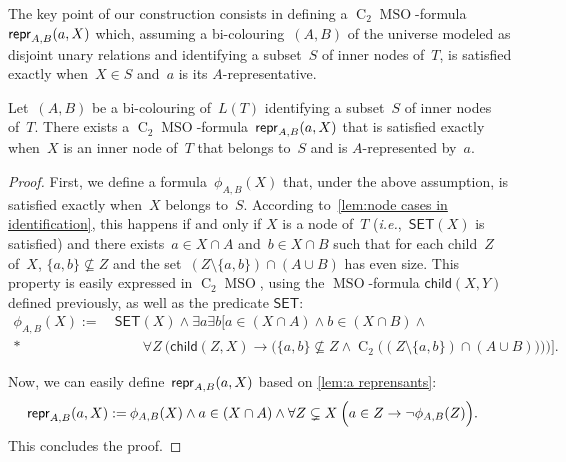 \documentclass{lmcs} %
\newcommand{\MSO}{\ensuremath{\operatorname{MSO}}\xspace}
\newcommand{\CMSO}[1][]{\ensuremath{\C[#1]{\!\!}\MSO}\xspace}
\newcommand{\C}[1][]{\ensuremath{\operatorname{C}_{#1}}\xspace}
\newcommand{\SET}{\ensuremath{\mathsf{SET}}\xspace}
\newcommand{\child}{\ensuremath{\mathsf{child}}\xspace}
\newcommand{\ifof}{if and only if\xspace}
\renewcommand{\implies}{\rightarrow}
\def\ie{{\em i.e.}}
\begin{document}
The key point of our construction consists in defining
a \CMSO[2]-formula
$\repr_{A,B}(a, X)$ which,
assuming a bi-colouring~$(A, B)$ of the universe
modeled as disjoint unary relations
and
identifying a subset~$S$ of inner nodes of~$T$,
is satisfied exactly when~$X\in S$ and~$a$ is its $A$-representative.
\begin{lem}
    \label{lem:repr MSO}
    Let~$(A,B)$ be a bi-colouring of~$L(T)$
    identifying a subset~$S$ of inner nodes of~$T$.
    There exists a \CMSO[2]-formula~$\repr_{A,B}(a, X)$
    that is satisfied exactly
    when~$X$ is an inner node of~$T$
    that belongs to~$S$ and is $A$-represented by~$a$.
\end{lem}
\begin{proof}
    First, we define a formula~$\phi_{A,B}(X)$
    that, under the above assumption,
    is satisfied exactly when~$X$ belongs to~$S$.
    According to~\autoref{lem:node cases in identification},
    this happens \ifof
    $X$ is a node of~$T$
    (\ie,~$\SET(X)$ is satisfied)
    and there exists~$a\in X\cap A$ and~$b\in X\cap B$
    such that for each child~$Z$ of~$X$,
    $\{a,b\}\nsubseteq Z$
    and
    the set~$(Z\setminus\{a,b\})\cap(A\cup B)$ has even size.
    This property is easily expressed in \CMSO[2],
    using the \MSO-formula $\child(X, Y)$ defined previously,
    as well as the predicate $\SET$:
    \begin{align*}
        \phi_{A,B}(X):=\:
        &
        \SET(X)
        \land
        \exists a\exists b\Big[a\in (X\cap A)\land b\in (X\cap B)\land
        \\*&\qquad
        \forall Z\:
        \Big(
        \child(Z, X) \implies \Big(
        \{a,b\}\nsubseteq Z
        \land
        \C[2]\big((Z\setminus\{a,b\})\cap(A\cup B)\big)
        \Big)\Big)\Big].
    \end{align*}

    Now, we can easily define~$\repr_{A,B}(a, X)$
    based on \autoref{lem:a reprensants}:
    \begin{align*}
        \repr_{A,B}(a, X):=\:&
        \phi_{A,B}(X) \land a\in (X\cap A)
        \land
        \forall Z\subsetneq X\:
        \Big(
        a\in Z
        \implies \neg \phi_{A,B}(Z)
        \Big).
    \end{align*}
    This concludes the proof.
\end{proof}
\end{document}
